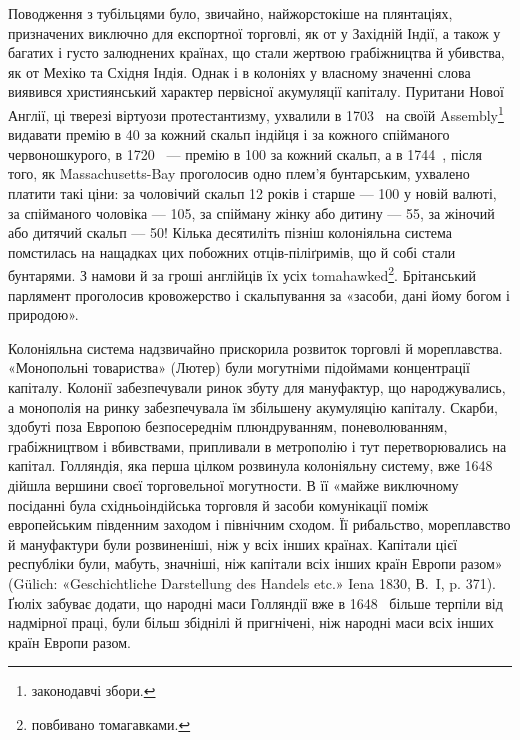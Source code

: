 Поводження з тубільцями було, звичайно, найжорстокіше
на плянтаціях, призначених виключно для експортної торговлі,
як от у Західній Індії, а також у багатих і густо залюднених
країнах, що стали жертвою грабіжництва й убивства, як от Мехіко
та Східня Індія. Однак і в колоніях у власному значенні
слова виявився християнський характер первісної акумуляції
капіталу. Пуритани Нової Англії, ці тверезі віртуози протестантизму,
ухвалили в 1703~ на своїй Assembly\footnote*{
законодавчі збори. 
} видавати премію
в 40 за кожний скальп індійця і за кожного
спійманого червоношкурого, в 1720~ — премію в 100 за кожний скальп, а в 1744~, після того, як Massachusetts-Bay
проголосив одно плем’я бунтарським, ухвалено платити
такі ціни: за чоловічий скальп 12 років і старше — 100 у
новій валюті, за спійманого чоловіка — 105, за спійману
жінку або дитину — 55, за
жіночий або дитячий скальп — 50!
Кілька десятиліть пізніш колоніяльна система помстилась на нащадках
цих побожних отців-піліґримів,
що й собі стали бунтарями. З намови й за гроші англійців їх усіх
tomahawked\footnote*{
повбивано томагавками. 
}. Брітанський парлямент
проголосив кровожерство і скальпування
за «засоби, дані йому богом і природою».

Колоніяльна система надзвичайно прискорила розвиток торговлі й мореплавства. «Монопольні товариства»
(Лютер) були могутніми підоймами концентрації капіталу. Колонії забезпечували ринок збуту для
мануфактур, що народжувались, а монополія на ринку забезпечувала їм збільшену акумуляцію капіталу.
Скарби, здобуті поза Европою безпосереднім плюндруванням, поневолюванням, грабіжництвом і
вбивствами, припливали в метрополію і тут перетворювались на капітал. Голляндія, яка перша цілком
розвинула колоніяльну систему, вже 1648~ дійшла вершини своєї торговельної могутности. В її «майже
виключному посіданні була східньоіндійська торговля й засоби
комунікації поміж европейським південним заходом і північним сходом. Її рибальство, мореплавство й
мануфактури були розвиненіші, ніж у всіх інших країнах. Капітали цієї республіки були, мабуть,
значніші, ніж капітали всіх інших країн Европи разом» (Gülich: «Geschichtliche Darstellung des
Handels etc.» Iena 1830, В.~I, p. 371). Ґюліх забуває додати, що народні маси Голляндії вже в 1648~ більше терпіли від надмірної праці, були більш збіднілі й пригнічені, ніж народні маси всіх інших
країн Европи разом.

